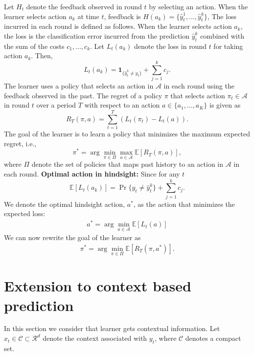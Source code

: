 \documentclass[draft, onecolumn, 12pt]{IEEEtran}
\begin{document}
Let $H_t$ denote the feedback observed in round $t$ by selecting an action. When the learner selects action $a_k$ at time $t$, feedback is $H(a_k)=\{\hat{y}^1_t,\ldots,\hat{y}^k_t\}$,
The loss incurred in each round is defined as follows. When the learner selects action $a_k$, the loss is the classification error incurred from the prediction $\hat{y}^k_t$ combined with the sum of the costs $c_1,\ldots,c_k$. Let $L_t(a_k)$ denote the loss in round $t$ for taking action $a_k$. Then,
\begin{equation}
L_t(a_k)=\mathbf{1}_{\{\hat{y}^k_t\neq y_t\}}+\sum_{j=1}^kc_j.
\end{equation} 
The learner uses a policy that selects an action in  $\mathcal{A}$ in each round using the feedback observed in the past. The regret of a policy $\pi$ that selects action $\pi_t \in\mathcal{A}$ in round $t$ over a period $T$ with respect to an action $a \in \{a_1,\ldots,a_K\}$ is given as 
\begin{equation}
R_T(\pi,a)= \sum_{t=1}^T (L_t(\pi_t)-L_t(a)).
\end{equation}
The goal of the learner is to learn a policy that minimizes the maximum expected regret, i.e.,
\begin{equation}
\pi^*= \arg \min_{\pi \in \Pi } \max_{a \in \mathcal{A}}\mathbb{E}[R_T(\pi,a)],
\end{equation}
where $\Pi$ denote the set of policies that maps past history to an action in $\mathcal{A}$ in each round. 
\noindent
{\bf Optimal action in hindsight: } Since for any $t$ 
\begin{equation}
\mathbb{E}[L_t(a_k)]=\Pr\{y_t\neq \hat{y}^k_t\}+\sum_{j=1}^kc_j.
\end{equation}
We denote the optimal hindsight action, $a^*$, as the action that minimizes the expected loss:
\begin{align}
a^*=\arg \min_{a \in \mathcal{A}}\mathbb{E}[L_t(a)]
\end{align}
We can now rewrite the goal of the learner as 
\begin{align}
\pi^*= \arg \min_{\pi \in \Pi } \mathbb{E}[R_T(\pi,a^*)].
\end{align}

\section{Extension to context based prediction}
In this section we consider that learner gets contextual information. Let $x_t \in \mathcal{C}\subset\mathcal{R}^d$ denote the context associated with $y_t$, where $\mathcal{C}$ denotes a compact set. 
\end{document}
